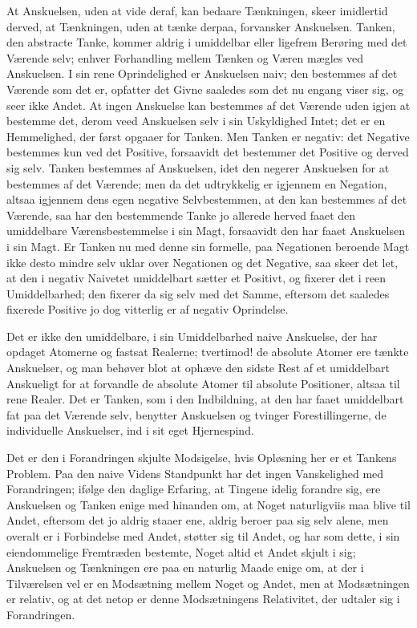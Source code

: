 \documentclass[11pt]{book}
\newcommand{\opage}[1]{\marginnote{\footnotesize\textit{[#1]}}}
\begin{document}
At Anskuelsen, uden at vide deraf, kan bedaare Tænkningen, skeer
imidlertid derved, at Tænkningen, uden at tænke derpaa, forvansker
Anskuelsen. Tanken, den abstracte Tanke, kommer aldrig i umiddelbar
eller ligefrem Berøring med det Værende selv; enhver Forhandling
mellem Tænken og Væren mægles ved Anskuelsen. I sin rene
Oprindelighed er Anskuelsen naiv; den bestemmes af det Værende som
det er, opfatter det Givne saaledes som det nu engang viser sig, og
seer ikke Andet. At ingen Anskuelse kan bestemmes af det Værende uden
igjen at bestemme det, derom veed Anskuelsen selv i sin Uskyldighed
Intet; det er en Hemmelighed, der først opgaaer for Tanken. Men
Tanken er negativ: det Negative bestemmes kun ved det Positive,
forsaavidt det bestemmer det Positive og derved sig selv. Tanken
bestemmes af Anskuelsen, idet den negerer Anskuelsen for at bestemmes
af det Værende; men da det udtrykkelig er igjennem en Negation,
altsaa igjennem dens egen negative Selvbestemmen, at den kan
bestemmes af det Værende, saa har den bestemmende Tanke jo allerede
herved faaet den umiddelbare Værensbestemmelse i sin Magt, forsaavidt
den har faaet Anskuelsen i sin Magt.
\opage{15} \setcounter{footnote}{0}%
Er Tanken nu med denne sin formelle, paa Negationen beroende Magt
ikke desto mindre selv uklar over Negationen og det Negative, saa
skeer det let, at den i negativ Naivetet umiddelbart sætter et
Positivt, og fixerer det i reen Umiddelbarhed; den fixerer da sig
selv med det Samme, eftersom det saaledes fixerede Positive jo dog
vitterlig er af negativ Oprindelse.

Det er ikke den umiddelbare, i sin Umiddelbarhed naive Anskuelse,
der har opdaget Atomerne og fastsat Realerne; tvertimod! de absolute
Atomer ere tænkte Anskuelser, og man behøver blot at ophæve den
sidste Rest af et umiddelbart Anskueligt for at forvandle de absolute
Atomer til absolute Positioner, altsaa til rene Realer. Det er
Tanken, som i den Indbildning, at den har faaet umiddelbart fat paa
det Værende selv, benytter Anskuelsen og tvinger Forestillingerne, de
individuelle Anskuelser, ind i sit eget Hjernespind.

Det er den i Forandringen skjulte Modsigelse, hvis Opløsning her er
et Tankens Problem. Paa den naive Videns Standpunkt har det ingen
Vanskelighed med Forandringen; ifølge den daglige Erfaring, at
Tingene idelig forandre sig, ere Anskuelsen og Tanken enige med
hinanden om, at Noget naturligviis maa blive til Andet, eftersom det
jo aldrig staaer ene, aldrig beroer paa sig selv alene, men overalt
er i Forbindelse med Andet, støtter sig til Andet, og har som dette,
i sin eiendommelige Fremtræden bestemte, Noget altid et Andet skjult
i sig; Anskuelsen og Tænkningen ere paa en naturlig Maade enige om,
at der i Tilværelsen vel er en Modsætning mellem Noget og Andet, men
at Modsætningen er relativ, og at det netop er denne Modsætningens
Relativitet, der udtaler sig i Forandringen.
\end{document}
